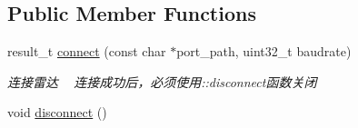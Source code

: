 \subsection*{Public Member Functions}
\begin{DoxyCompactItemize}
\item 
result\+\_\+t \hyperlink{classydlidar_1_1_y_dlidar_driver_a2c5eeecccaa6ed874635de1617e8d7d8}{connect} (const char $\ast$port\+\_\+path, uint32\+\_\+t baudrate)
\begin{DoxyCompactList}\small\item\em 连接雷达 ~\newline
连接成功后，必须使用\+::disconnect函数关闭 \end{DoxyCompactList}\item 
void \hyperlink{classydlidar_1_1_y_dlidar_driver_aa26790ae49d33936229fa67739a8ff5f}{disconnect} ()\hypertarget{classydlidar_1_1_y_dlidar_driver_aa26790ae49d33936229fa67739a8ff5f}{}\label{classydlidar_1_1_y_dlidar_driver_aa26790ae49d33936229fa67739a8ff5f}


\end{DoxyCompactItemize}
